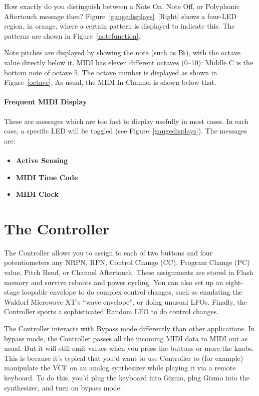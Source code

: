 \documentclass{article}
\begin{document}
How exactly do you distinguish between a Note On, Note Off, or Polyphonic Aftertouch message then?  Figure~{\ref{gaugedisplays}}~[Right] shows a four-LED region, in orange, where a certain pattern is displayed to indicate this.  The patterns are shown in Figure~\ref{notefunction}.

Note pitches are displayed by showing the note (such as B$\flat$), with the octave value directly below it.  MIDI has eleven different octaves (0--10): Middle C is the bottom note of octave 5.  The octave number is displayed as shown in Figure~\ref{octave}.  As usual, the MIDI In Channel is shown below that.


\paragraph{Frequent MIDI Display}  These are messages which are too fast to display usefully in most cases.  In each case, a specific LED will be toggled (see Figure~\ref{gaugedisplays}).  The messages are:

\paragraph{}\vspace{-2em}\begin{itemize}
\item {\bf Active Sensing}
\item {\bf MIDI Time Code}
\item {\bf MIDI Clock}
\end{itemize}


\clearpage
\section {The Controller}
\label{controller}

The Controller allows you to assign to each of two buttons and four potentiometers any NRPN, RPN, Control Change (CC), Program Change (PC) value, Pitch Bend, or Channel Aftertouch.%
These assignments are stored in Flash memory and survive reboots and power cycling.  You can also set up an eight-stage loopable envelope to do complex control changes, such as emulating the Waldorf Microwave XT's ``wave envelope'', or doing unusual LFOs.  Finally, the Controller sports a sophisticated Random LFO to do control changes.

The Controller interacts with Bypass mode differently than other applications.  In bypass mode, the Controller passes all the incoming MIDI data to MIDI out as usual.  But it will still emit values when you press the buttons or more the knobs.  This is because it's typical that you'd want to use Controller to (for example) manipulate the VCF on an analog synthesizer while playing it via a remote keyboard.  To do this, you'd plug the keyboard into Gizmo, plug Gizmo into the synthesizer, and turn on bypass mode.
\end{document}

